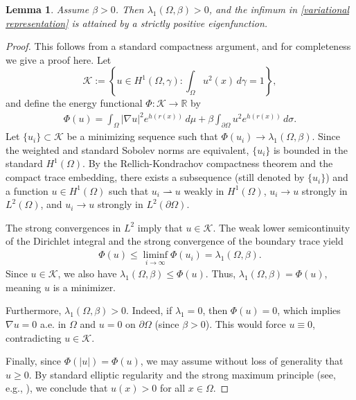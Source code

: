 \documentclass[11pt,leqno]{amsart}
\newtheorem{lemma}{Lemma}[section]
\numberwithin{equation}{section}
\begin{document}
\begin{lemma}\label{existence and positive}
   Assume $\beta>0$. Then $\lambda_{1}(\Omega,\beta) > 0$, and the infimum in \eqref{variational representation} is attained by a strictly positive eigenfunction.
\end{lemma}

\begin{proof}
This follows from a standard compactness argument, and for completeness we give a proof here.
Let $$\mathcal{K} := \left\{ u \in H^1(\Omega,\gamma) : \int_{\Omega} u^2(x)  \, d\gamma = 1 \right\},$$
and define the energy functional $\Phi : \mathcal{K} \to \mathbb{R}$ by
\begin{align*}
\Phi(u) = \int_{\Omega} |\nabla u|^2 e^{h(r(x))} \, d\mu + \beta \int_{\partial\Omega} u^2 e^{h(r(x))} \, d\sigma.
\end{align*}
Let $\{u_i\} \subset \mathcal{K}$ be a minimizing sequence such that $\Phi(u_i) \to \lambda_{1}(\Omega,\beta)$. Since the weighted and standard Sobolev norms are equivalent, $\{u_i\}$ is bounded in the standard $H^1(\Omega)$. By the Rellich-Kondrachov compactness theorem and the compact trace embedding, there exists a subsequence (still denoted by $\{u_i\}$) and a function $u \in H^1(\Omega)$ such that $u_i \rightharpoonup u$ weakly in $H^1(\Omega)$, $u_i \to u$ strongly in $L^2(\Omega)$, and $u_i \to u$ strongly in $L^2(\partial\Omega)$. 

The strong convergences in $L^2$ imply that $u \in \mathcal{K}$. The weak lower semicontinuity of the Dirichlet integral and the strong convergence of the boundary trace yield
\begin{align}
    \Phi(u) \leq \liminf_{i \to \infty} \Phi(u_i) = \lambda_{1}(\Omega,\beta).
\end{align}
Since $u \in \mathcal{K}$, we also have $\lambda_{1}(\Omega,\beta) \leq \Phi(u)$. Thus, $\lambda_{1}(\Omega,\beta) = \Phi(u)$, meaning $u$ is a minimizer. 

Furthermore, $\lambda_1(\Omega, \beta) > 0$. Indeed, if $\lambda_1 = 0$, then $\Phi(u) = 0$, which implies $\nabla u = 0$ a.e. in $\Omega$ and $u = 0$ on $\partial\Omega$ (since $\beta > 0$). This would force $u \equiv 0$, contradicting $u \in \mathcal{K}$.

Finally, since $\Phi(|u|) = \Phi(u)$, we may assume without loss of generality that $u \geq 0$. By standard elliptic regularity and the strong maximum principle (see, e.g., \cite[Chapter 2, Theorem 5]{Protter}), we conclude that $u(x) > 0$ for all $x \in \Omega$.
\end{proof}
\end{document}
